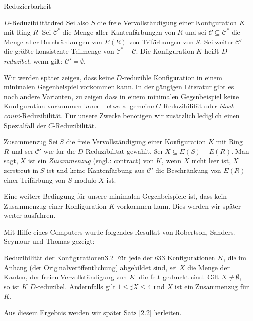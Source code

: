 \begin{section}{Reduzierbarkeit}
 
 \begin{definitionl}{$D$-Reduzibilität}{dred}
  Sei also $S$ die freie Vervollständigung einer Konfiguration $K$ mit Ring $R$. Sei $\mathscr{C}^*$ die Menge aller Kantenfärbungen von $R$ und sei $\mathscr{C} \subseteq \mathscr{C}^*$ die Menge aller Beschränkungen von $E(R)$ von Trifärbungen von $S$. Sei weiter $\mathscr{C}'$ die größte konsistente Teilmenge von $\mathscr{C}^* - \mathscr{C}$. Die Konfiguration $K$ heißt \textit{$D$-reduzibel}, wenn gilt: $\mathscr{C}' = \emptyset$.
 \end{definitionl}
 
 Wir werden später zeigen, dass keine $D$-reduzible Konfiguration in einem minimalen Gegenbeispiel vorkommen kann. In der gängigen Literatur gibt es noch andere Varianten, zu zeigen dass in einem minimalen Gegenbeispiel keine Konfiguration vorkommen kann -- etwa allgemeine $C$-Reduzibilität oder \textit{block count}-Reduzibilität. Für unsere Zwecke benötigen wir zusätzlich lediglich einen Spezialfall der $C$-Reduzibilität.

 \begin{definition}{Zusammenzug}
  Sei $S$ die freie Vervollständigung einer Konfiguration $K$ mit Ring $R$ und sei $\mathscr{C}'$ wie für die $D$-Reduzibilität gewählt. Sei $X \subseteq E(S) - E(R)$. Man sagt, $X$ ist ein \textit{Zusammenzug} (engl.: contract) von $K$, wenn $X$ nicht leer ist, $X$ zerstreut in $S$ ist und keine Kantenfärbung aus $\mathscr{C}'$ die Beschränkung von $E(R)$ einer Trifärbung von $S$ modulo $X$ ist.
 \end{definition}
 
 Eine weitere Bedingung für unsere minimalen Gegenbeispiele ist, dass kein Zusammenzug einer Konfiguration $K$ vorkommen kann. Dies werden wir später weiter ausführen.
 
 Mit Hilfe eines Computers wurde folgendes Resultat von Robertson, Sanders, Seymour und Thomas gezeigt:
 
 \begin{satzl}{Reduzibilität der Konfigurationen}{3.2}
  Für jede der 633 Konfigurationen $K$, die im Anhang (der Originalveröffentlichung) abgebildet sind, sei $X$ die Menge der Kanten, der freien Vervollständigung von $K$, die fett gedruckt sind. Gilt $X \neq \emptyset$, so ist $K$ $D$-reduzibel. Andernfalls gilt $1\leq \sharp X \leq 4$ und $X$ ist ein Zusammenzug für $K$.
 \end{satzl}
 
 Aus diesem Ergebnis werden wir später Satz \ref{2.2} herleiten.


\end{section}
